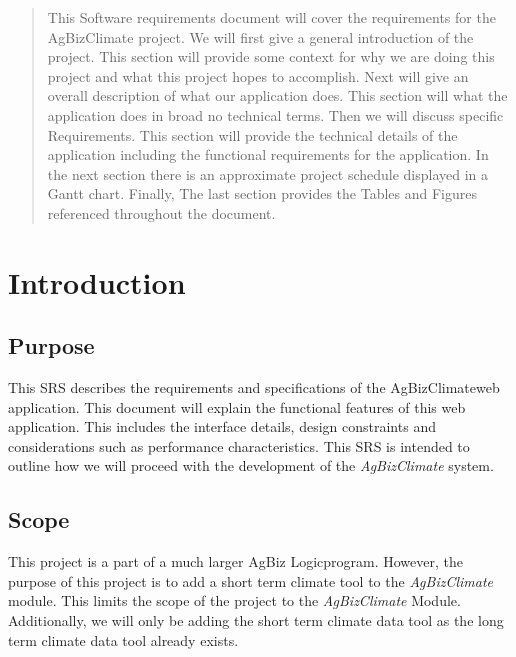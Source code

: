 \documentclass[onecolumn, draftclsnofoot,10pt, compsoc]{article}
\begin{document}
\begin{titlepage}
\begin{singlespace}
        \begin{abstract}
			This Software requirements document will cover the requirements for the AgBizClimate project. We will first give a general introduction of the project. This section will provide some context for why we are doing this project and what this project hopes to accomplish. Next will give an overall description of what our application does. This section will what the application does in broad no technical terms. Then we will discuss specific Requirements. This section will provide the technical details of the application including the functional requirements for the application. In the next section there is an approximate project schedule displayed in a Gantt chart. Finally, The last section provides the Tables and Figures referenced throughout the document.\\
        \end{abstract}
    \end{singlespace}
\end{titlepage}
\newpage
{}
\tableofcontents
\listoffigures 
\newpage
\clearpage

\section{Introduction}
		\subsection{Purpose}
		This SRS describes the requirements and specifications of the AgBizClimate\texttrademark web application. This document will explain the functional features of this web application. This includes the interface details, design constraints and considerations such as performance characteristics. This SRS is intended to outline how we will proceed with the development of the \textit{AgBizClimate} system.\\

		\subsection{Scope}
			This project is a part of a much larger AgBiz Logic\texttrademark program. However, the purpose of this project is to add a short term climate tool to the \textit{AgBizClimate} module. This limits the scope of the project to the \textit{AgBizClimate} Module. Additionally, we will only be adding the short term climate data tool as the long term climate data tool already exists.\\
\end{document}
